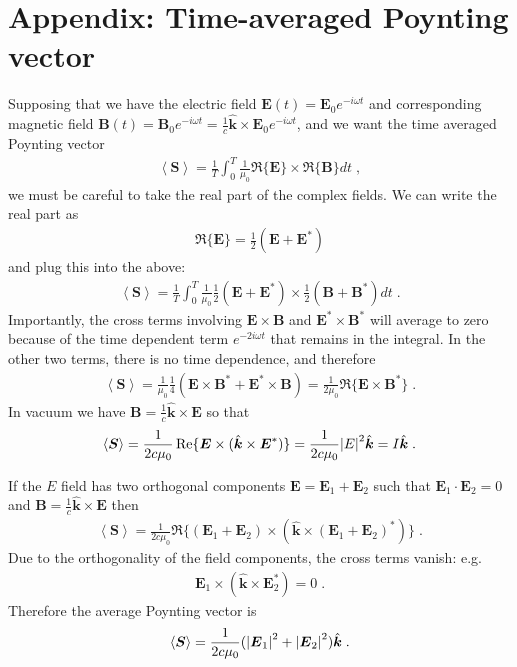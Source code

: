\documentclass[12pt]{article}
\renewcommand{\vec}[1]{\boldsymbol{#1}}
\newcommand{\hvec}[1]{\hat{\vec{#1}}}
\newcommand{\avg}[1]{\left\langle #1 \right\rangle}
\begin{document}
\section{Appendix: Time-averaged Poynting vector}\label{sec:poynt}

Supposing that we have the electric field $\vec{E}(t)=\vec{E}_0 e^{-i\omega t}$ and corresponding magnetic field $\vec{B}(t)=\vec{B}_0 e^{-i\omega t}=\frac{1}{c} \hvec{k}\times \vec{E}_0e^{-i\omega t}$, and we want the time averaged Poynting vector
\begin{align}
 \avg{\vec{S}} = \frac{1}{T}\int_0^{T}\frac{1}{\mu_0} \Re\{ \vec{E} \}\times \Re\{ \vec{B} \} dt \;,
\end{align}
we must be careful to take the real part of the complex fields.  We can write the real part as
\begin{align}
 \Re\{\vec{E}\} = \frac{1}{2} (\vec{E} + \vec{E}^*)
\end{align}
and plug this into the above:
\begin{align}
 \avg{\vec{S}} = \frac{1}{T}\int_0^{T} \frac{1}{\mu_0}\frac{1}{2} (\vec{E} + \vec{E}^*)\times \frac{1}{2} (\vec{B} + \vec{B}^*) dt \;.
\end{align}
Importantly, the cross terms involving $\vec{E}\times\vec{B}$ and $\vec{E}^*\times\vec{B}^*$ will average to zero because
of the time dependent term $e^{-2i\omega t}$ that remains in the integral.  In the other two terms, there is no time
dependence, and therefore
\begin{align}
 \avg{\vec{S}} = \frac{1}{\mu_0} \frac{1}{4} (\vec{E}\times\vec{B}^* +  \vec{E}^*\times\vec{B}) = \frac{1}{2\mu_0}\Re\{ \vec{E}\times\vec{B}^*\}\;.
\end{align}
In vacuum we have $\vec{B}=\frac{1}{c}\hvec{k}\times \vec{E}$ so that
\begin{align}
 \avg{\vec{S}} = \frac{1}{2c\mu_0}\Re\{ \vec{E}\times(\hvec{k}\times\vec{E}^*)\} = \frac{1}{2c\mu_0} \abs{E}^2 \hvec{k} = I\hvec{k} \;.
\end{align}

If the $E$ field has two orthogonal components $\vec{E}=\vec{E}_1 + \vec{E}_2$ such that $\vec{E}_1\cdot\vec{E}_2=0$ and 
$\vec{B}=\frac{1}{c}\hvec{k}\times \vec{E}$ then
\begin{align}
 \avg{\vec{S}} = \frac{1}{2c\mu_0}\Re\{ (\vec{E}_1 + \vec{E}_2)\times(\hvec{k}\times(\vec{E}_1 + \vec{E}_2)^*)\} \;.
\end{align}
Due to the orthogonality of the field components, the cross terms vanish: e.g.
\begin{align}
 \vec{E}_1 \times(\hvec{k}\times \vec{E}_2^*) = 0 \;.
\end{align}
Therefore the average Poynting vector is
\begin{align}
 \avg{\vec{S}} = \frac{1}{2c\mu_0} ( \abs{\vec{E}_1}^2 + \abs{\vec{E}_2}^2)\hvec{k}\;.
\end{align}
\end{document}
